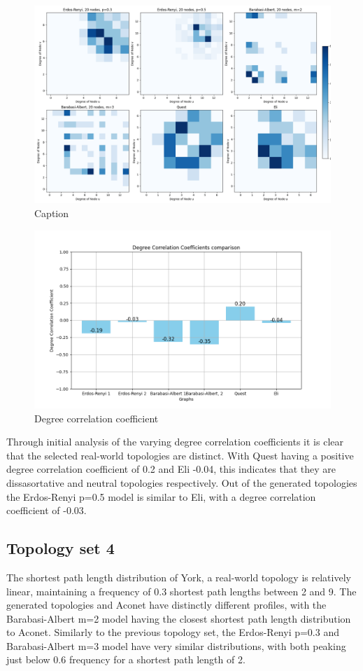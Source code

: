 \begin{figure}
    \centering
    \includegraphics[width=0.9\linewidth]{images/FINAL-TOPO-COMP/Degree-correlation-matrices/20-matrix.png}
    \caption{Caption}
    \label{fig:enter-label}
\end{figure}

\begin{figure}
    \centering
    \includegraphics[width=0.9\linewidth]{images/FINAL-TOPO-COMP/Degree-correlation-coeff/deg-coeff-20.png}
    \caption{Degree correlation coefficient}
    \label{fig:enter-label}
\end{figure}
Through initial analysis of the varying degree correlation coefficients it is clear that the selected real-world topologies are distinct. With Quest having a positive degree correlation coefficient of 0.2 and Eli -0.04, this indicates that they are dissasortative and neutral topologies respectively. Out of the generated topologies the Erdos-Renyi p=0.5 model is similar to Eli, with a degree correlation coefficient of -0.03. 

\subsection{Topology set 4}
The shortest path length distribution of York, a real-world topology is relatively linear, maintaining a frequency of 0.3 shortest path lengths between 2 and 9. The generated topologies and Aconet have distinctly different profiles, with the Barabasi-Albert m=2 model having the closest shortest path length distribution to Aconet. Similarly to the previous topology set, the Erdos-Renyi p=0.3 and Barabasi-Albert m=3 model have very similar distributions, with both peaking just below 0.6 frequency for a shortest path length of 2. 

